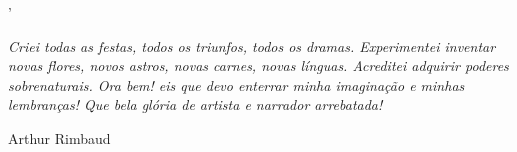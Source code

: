 \documentclass[
	12pt,				%
	openright,			%
	twoside,			%
	a4paper,			%
	english,			%
	french,				%
	spanish,			%
        italian,                        %
	brazil				%
	]{abntex2}
\begin{document}
\frenchspacing 

\pretextual

\imprimircapa

\imprimirfolhaderosto*

%


% 
%

'%

\epigraph{\emph{Criei todas as festas, todos os triunfos, todos os dramas. Experimentei inventar novas flores, novos astros, novas carnes, novas línguas. Acreditei adquirir poderes sobrenaturais. Ora bem! eis que devo enterrar minha imaginação e minhas lembranças!  Que bela glória de artista e narrador arrebatada!}}{Arthur Rimbaud }
\newpage
\end{document}
